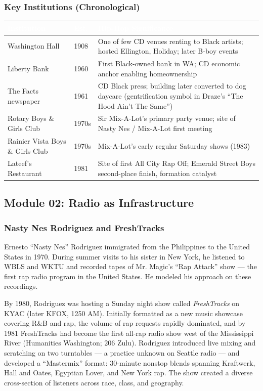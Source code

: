 \documentclass[11pt,letterpaper]{article}
\newcommand{\tableheader}[1]{\textbf{\sffamily\textcolor{white}{#1}}}
\begin{document}
\subsubsection{Key Institutions (Chronological)}

\begin{center}
\begin{tabularx}{\textwidth}{L{3cm}L{2.5cm}X}
\toprule
{}
\tableheader{Institution} & \tableheader{Est.} & \tableheader{Hip-Hop Significance} \\
\midrule
Washington Hall & 1908 & One of few CD venues renting to Black artists; hosted Ellington, Holiday; later B-boy events \\
Liberty Bank & 1960 & First Black-owned bank in WA; CD economic anchor enabling homeownership \\
The Facts newspaper & 1961 & CD Black press; building later converted to dog daycare (gentrification symbol in Draze's ``The Hood Ain't The Same'') \\
Rotary Boys \& Girls Club & 1970s & Sir Mix-A-Lot's primary party venue; site of Nasty Nes / Mix-A-Lot first meeting \\
Rainier Vista Boys \& Girls Club & 1970s & Mix-A-Lot's early regular Saturday shows (1983) \\
Lateef's Restaurant & 1981 & Site of first All City Rap Off; Emerald Street Boys second-place finish, formation catalyst \\
\bottomrule
\end{tabularx}
\end{center}

\subsection{Module 02: Radio as Infrastructure}

\subsubsection{Nasty Nes Rodriguez and FreshTracks}

Ernesto ``Nasty Nes'' Rodriguez immigrated from the Philippines to the United States in 1970. During summer visits to his sister in New York, he listened to WBLS and WKTU and recorded tapes of Mr. Magic's ``Rap Attack'' show --- the first rap radio program in the United States. He modeled his approach on these recordings.

By 1980, Rodriguez was hosting a Sunday night show called \textit{FreshTracks} on KYAC (later KFOX, 1250 AM). Initially formatted as a new music showcase covering R\&B and rap, the volume of rap requests rapidly dominated, and by 1981 FreshTracks had become the first all-rap radio show west of the Mississippi River (Humanities Washington; 206 Zulu). Rodriguez introduced live mixing and scratching on two turntables --- a practice unknown on Seattle radio --- and developed a ``Mastermix'' format: 30-minute nonstop blends spanning Kraftwerk, Hall and Oates, Egyptian Lover, and New York rap. The show created a diverse cross-section of listeners across race, class, and geography.
\end{document}
